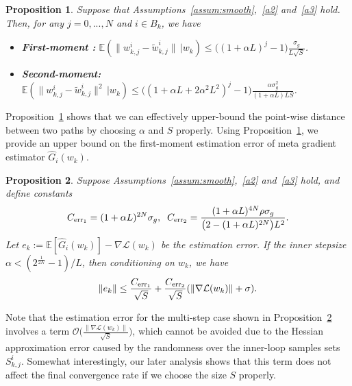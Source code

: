 \documentclass{osudissert96}
\newtheorem{proposition}{Proposition}
\begin{document}
\begin{proposition}\label{le:distance}
	Suppose that  Assumptions~\ref{assum:smooth},~\ref{a2} and~\ref{a3} hold. Then, for any  $j=0,..., N$ and $i \in B_k$, we have
\begin{itemize}

	\item {\bf First-moment :} $\mathbb{E}(\|w_{k,j}^i - \widetilde w_{k,j}^i \| \, | w_k) \leq \big( (1+\alpha L) ^j -1 \big) \frac{\sigma_g }{L \sqrt{S}}$.

\item  {\bf Second-moment:} $\mathbb{E}(\|w_{k,j}^i - \widetilde w_{k,j}^i \|^2\, | w_k) \leq \big((1+\alpha L +2\alpha^2 L^2)^j -1 \big) \frac{\alpha \sigma_g ^2}{(1+\alpha L)L   S}$.
	\end{itemize}
\end{proposition}
Proposition~\ref{le:distance} shows that we can effectively upper-bound the point-wise distance between two paths  by choosing $\alpha$ and $S$ properly. Using Proposition~\ref{le:distance}, we provide an upper bound on the first-moment estimation error of meta gradient estimator {$\widehat G_i(w_k)$}. %
\begin{proposition}\label{th:first-est} 
	Suppose   Assumptions~\ref{assum:smooth},~\ref{a2} and~\ref{a3} hold, and define constants %
	\begin{align}\label{ppolp}
  C_{{\text{\normalfont err}}_1} =  (1+\alpha L)^{2N} \sigma_g, \;\;C_{{\text{\normalfont err}}_2}  = \frac{ (1+\alpha L) ^{4N}\rho \sigma_g}{\big (2-  (1+\alpha L)^{2N}\big )L^2} .
	\end{align}
	Let $e_k := \mathbb{E}[\widehat G_i(w_k)] - \nabla \mathcal{L}(w_k) $
	 be the estimation error. If  the inner stepsize $\alpha < (2^{\frac{1}{2N}} - 1)/L$, then conditioning on $w_k$, we have 
	\begin{align}\label{es:original}
	\|e_k\| \leq \frac{C_{{\text{\normalfont err}}_1} }{\sqrt{S}} + \frac{C_{{\text{\normalfont err}}_2}  }{\sqrt{S}} (\|\nabla \mathcal{L}(w_k)\| + \sigma).
	\end{align} 
\end{proposition}
Note that 
the estimation error for the multi-step case shown in Proposition~\ref{th:first-est} involves a term $\mathcal{O}\big(\frac{\|\nabla \mathcal{L}(w_k)\|}{\sqrt{S}}\big)$, which cannot be avoided due to the Hessian approximation error caused by the randomness over the inner-loop samples sets $S_{k,j}^i$. Somewhat interestingly, our later analysis shows that this term does not affect the final convergence rate if we choose the size $S$ properly. 
\end{document}
